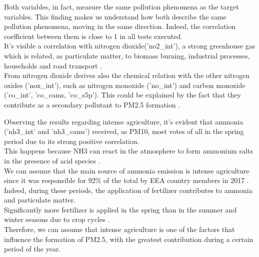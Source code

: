 Both variables, in fact, measure the same pollution phenomena as the target variables. This finding makes us understand how both describe the same pollution phenomena, moving in the same direction. Indeed, the correlation coefficient between them is close to 1 in all tests executed.\\
It's visible a correlation with nitrogen dioxide('no2\_int'), a strong greenhouse gas which is related, as particulate matter, to biomass burning, industrial processes, households and road transport \cite{zellner2000john} \cite{maranzano2022air}.\\
From nitrogen dioxide derives also the chemical relation with the other nitrogen oxides ('nox\_int'), such as nitrogen monoxide ('no\_int') and carbon monoxide ('co\_int', 'co\_cams, 'co\_s5p'). This could be explained by the fact that they contribute as a secondary pollutant to PM2.5 formation \cite{xie2015spatiotemporal}.
\par
Observing the results regarding intense agriculture, it's evident that ammonia ('nh3\_int' and 'nh3\_cams') received, as PM10, most votes of all in the spring period due to its strong positive correlation. \\
This happens because NH3 can react in the atmosphere to form ammonium salts in the presence of acid species \cite{viatte2021ammonia}.\\
We can assume that the main source of ammonia emission is intense agriculture since it was responsible for 92\% of the total by EEA country members in 2017 \cite{maranzano2022air}.\\
Indeed, during these periods, the application of fertilizer contributes to ammonia and particulate matter.\\
Significantly more fertilizer is applied in the spring than in the summer and winter seasons due to crop cycles \cite{goebes2003ammonia}.\\
Therefore, we can assume that intense agriculture is one of the factors that influence the formation of PM2.5, with the greatest contribution during a certain period of the year.
